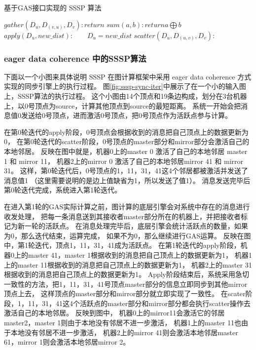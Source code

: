 \begin{algorithm}[!htbp]
  \small
  \caption{基于GAS接口实现的 SSSP 算法\cite{low2013graphlab}}\label{alg:SSSP}
  \begin{algorithmic}[1]
    \State $gather(D_u,D_{(v,u)},D_v): return$     
    \State $sum(a,b) : return a\bigoplus b $ 
    \State $apply(D_u, new\_dist): 
      \qquad D_u = new\_dist$
    \State $scatter(D_u, D_{(u,v)}, D_v):$     
    \EndIf
    \EndProcedure
  \end{algorithmic}
\end{algorithm}


\subsubsection{eager data coherence 中的SSSP算法}
下面以一个小图来具体说明 SSSP 在图计算框架中采用 eager data coherence 方式实现的同步引擎上的执行过程。
图\ref{fig:sssp-sync-iter}中展示了在一个小的输入图上，SSSP算法的执行过程。
这个小图由14个顶点和19条边构成，划分在3台机器上，以0号顶点为source，计算其他顶点到source的最短距离。
系统一开始会把消息值0发送给0号顶点，进而激活0号顶点，把0号顶点作为活跃点参与计算。

在第0轮迭代的apply阶段，0号顶点会根据收到的消息把自己顶点上的数据更新为0，
在第0轮迭代的scatter阶段，0号顶点的master部分和mirror部分会激活自己的本地邻居。
反映在图中就是，机器0上的master 0 激活了自己的本地邻居 master 1 和 mirror 11，
机器2上的mirror 0 激活了自己的本地邻居mirror 41 和 mirror 31。
这样，第0轮迭代后，0号顶点的1，11，31，41这4个邻居都被激活并发送了消息值1
（这里需要说明的是边上值缺省为1，所以发送了值1）。
消息发送完毕后第0轮迭代完成，系统进入第1轮迭代。

在进入第1轮的GAS实际计算之前，图计算的底层引擎会对系统中存在的消息进行收发处理，
把每一条消息送到其接收者master部分所在的机器上，并把接收者标记为新一轮的活跃点。
在消息处理完毕后，底层引擎会统计活跃点的数量，如果为0，那么迭代结束，运算完成，
如果不为0，那么继续进行GAS运算。
反映在图中，第1轮迭代，顶点1，11，31，41成为活跃点。
在第1轮迭代的apply阶段，机器0上的master 41，master 1根据收到的消息把自己顶点上的数据更新为1，
机器1上的master 11根据收到的消息把自己顶点上的数据更新为1，
机器2上的master 31根据收到的消息把自己顶点上的数据更新为1。
Apply阶段结束后，系统采用急切一致性的方法，把1，11，31，41号顶点master部分的信息立即同步到其他mirror顶点上去，
这样顶点的master部分和mirror部分就立即实现了一致性。
在scater阶段，1，11，31，41这4个活跃点的master部分和mirror部分都会执行scatter操作去激活自己的本地邻居。
反映到图中，
机器0上的mirror11会激活它的邻居master2，master 1则由于本地没有邻居不进一步激活，
机器1上的master 11也由于本地没有邻居不进一步激活，
机器2上的mirror 41则会激活本地邻居master 61，mirror 1则会激活本地邻居mirror 2。

